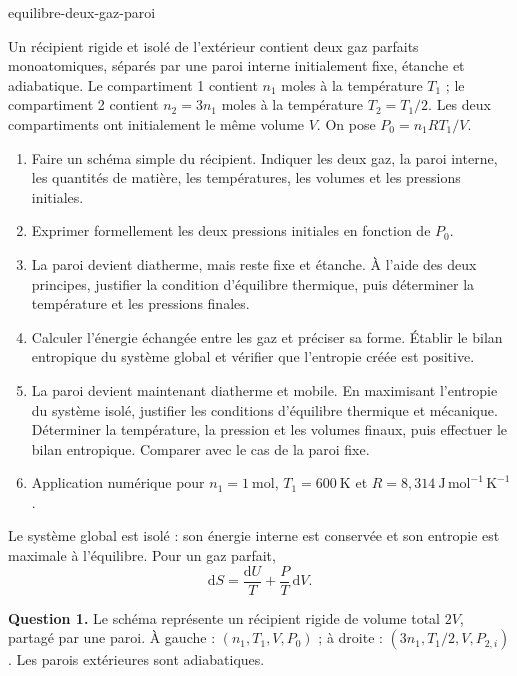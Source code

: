 \begin{exo}{equilibre-deux-gaz-paroi}

Un récipient rigide et isolé de l'extérieur contient deux gaz parfaits
monoatomiques, séparés par une paroi interne initialement fixe, étanche et
adiabatique. Le compartiment 1 contient $n_1$ moles à la température $T_1$ ;
le compartiment 2 contient $n_2=3n_1$ moles à la température $T_2=T_1/2$.
Les deux compartiments ont initialement le même volume $V$. On pose
$P_0=n_1RT_1/V$.

\begin{enumerate}
\item Faire un schéma simple du récipient. Indiquer les deux gaz, la paroi
interne, les quantités de matière, les températures, les volumes et les
pressions initiales.
\item Exprimer formellement les deux pressions initiales en fonction de $P_0$.
\item La paroi devient diatherme, mais reste fixe et étanche. À l'aide des deux
principes, justifier la condition d'équilibre thermique, puis déterminer la
température et les pressions finales.
\item Calculer l'énergie échangée entre les gaz et préciser sa forme. Établir
le bilan entropique du système global et vérifier que l'entropie créée est
positive.
\item La paroi devient maintenant diatherme et mobile. En maximisant l'entropie
du système isolé, justifier les conditions d'équilibre thermique et mécanique.
Déterminer la température, la pression et les volumes finaux, puis effectuer
le bilan entropique. Comparer avec le cas de la paroi fixe.
\item Application numérique pour $n_1=1\ \mathrm{mol}$,
$T_1=600\ \mathrm{K}$ et
$R=8{,}314\ \mathrm{J\,mol^{-1}\,K^{-1}}$.
\end{enumerate}

\begin{indication}
Le système global est isolé : son énergie interne est conservée et son
entropie est maximale à l'équilibre. Pour un gaz parfait,
\[
\mathrm{d}S=\frac{\mathrm{d}U}{T}+\frac{P}{T}\,\mathrm{d}V.
\]
\end{indication}

\begin{solution}
\textbf{Question 1.} Le schéma représente un récipient rigide de volume total
$2V$, partagé par une paroi. À gauche : $(n_1,T_1,V,P_0)$ ; à droite :
$(3n_1,T_1/2,V,P_{2,i})$. Les parois extérieures sont adiabatiques.


\end{solution}
\end{exo}
